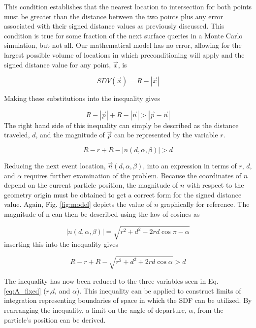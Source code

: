 This condition establishes that the nearest location to intersection for both
points must be greater than the distance between the two points plus any error
associated with their signed distance values as previously discussed. This
condition is true for some fraction of the next surface queries in a Monte Carlo
simulation, but not all.  Our mathematical model has no error, allowing for the
largest possible volume of locations in which preconditioning will apply and the
signed distance value for any point, $\vec{x}$, is

\begin{equation}
SDV(\vec{x}) =  R-|\vec{x}|
\end{equation}

Making these substitutions into the inequality gives

\begin{equation}
R-|\vec{p}| + R - |\vec{n}| >   |\vec{p}-\vec{n}|
\end{equation}
The right hand side of this inequality can simply be described as the distance
traveled, $d$, and the magnitude of $\vec{p}$ can be represented
by the variable $r$.

\begin{equation}
 R-r + R - |n(d,\alpha,\beta)| > d
\end{equation}

Reducing the next event location, $\vec{n}(d,\alpha,\beta)$, into an expression
in terms of $r$, $d$, and $\alpha$ requires further examination of the
problem. Because the coordinates of $n$ depend on the current particle position,
the magnitude of $n$ with respect to the geometry origin must be obtained to get
a correct form for the signed distance value. Again, Fig. \ref{fig:model} depicts the
value of $n$ graphically for reference. The magnitude of n can then be described
using the law of cosines as

\begin{equation}
|n(d,\alpha,\beta)| = \sqrt{r^2 + d^2 - 2rd \cos{\pi-\alpha}}
\end{equation}
inserting this into the inequality gives

\begin{equation}
R-r + R - \sqrt{r^2 + d^2 + 2rd \cos{\alpha}} > d
\end{equation}

The inequality has now been reduced to the three variables seen in
Eq. \ref{eq:A_fixed} ($r$,$d$, and $\alpha$). This inequality can be applied to
construct limits of integration representing boundaries of space in which the
SDF can be utilized. By rearranging the inequality, a limit on the angle of
departure, $\alpha$, from the particle's position can be derived.

